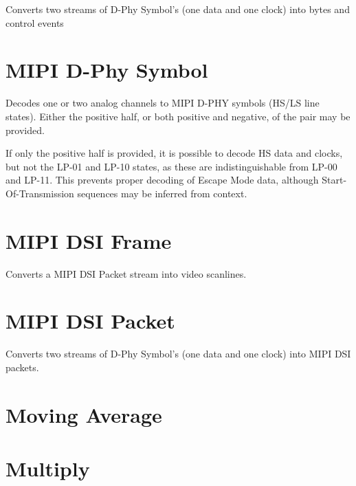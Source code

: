 Converts two streams of D-Phy Symbol's (one data and one clock) into bytes and control events

\pagebreak
\section{MIPI D-Phy Symbol}

Decodes one or two analog channels to MIPI D-PHY symbols (HS/LS line states). Either the positive half, or both
positive and negative, of the pair may be provided.

If only the positive half is provided, it is possible to decode HS data and clocks, but not the LP-01 and LP-10 states,
as these are indistinguishable from LP-00 and LP-11. This prevents proper decoding of Escape Mode data, although
Start-Of-Transmission sequences may be inferred from context.

\pagebreak
\section{MIPI DSI Frame}

Converts a MIPI DSI Packet stream into video scanlines.

\pagebreak
\section{MIPI DSI Packet}

Converts two streams of D-Phy Symbol's (one data and one clock) into MIPI DSI packets.

\pagebreak
\section{Moving Average}

\pagebreak
\section{Multiply}

